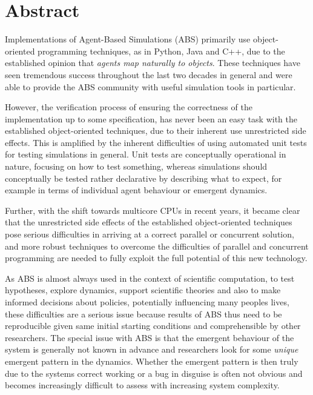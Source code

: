 \section*{Abstract}
Implementations of Agent-Based Simulations (ABS) primarily use object- \\ oriented programming techniques, as in Python, Java and C++, due to the established opinion that \textit{agents map naturally to objects}. These techniques have seen tremendous success throughout the last two decades in general and were able to provide the ABS community with useful simulation tools in particular.

However, the verification process of ensuring the correctness of the implementation up to some specification, has never been an easy task with the established object-oriented techniques, due to their inherent use unrestricted side effects. This is amplified by the inherent difficulties of using automated unit tests for testing simulations in general. Unit tests are conceptually operational in nature, focusing on how to test something, whereas simulations should conceptually be tested rather declarative by describing what to expect, for example in terms of individual agent behaviour or emergent dynamics.

Further, with the shift towards multicore CPUs in recent years, it became clear that the unrestricted side effects of the established object-oriented techniques pose serious difficulties in arriving at a correct parallel or concurrent solution, and more robust techniques to overcome the difficulties of parallel and concurrent programming are needed to fully exploit the full potential of this new technology. 

As ABS is almost always used in the context of scientific computation, to test hypotheses, explore dynamics, support scientific theories and also to make informed decisions about policies, potentially influencing many peoples lives, these difficulties are a serious issue because results of ABS thus need to be reproducible given same initial starting conditions and comprehensible by other researchers. The special issue with ABS is that the emergent behaviour of the system is generally not known in advance and researchers look for some \textit{unique} emergent pattern in the dynamics. Whether the emergent pattern is then truly due to the systems correct working or a bug in disguise is often not obvious and becomes increasingly difficult to assess with increasing system complexity. 

